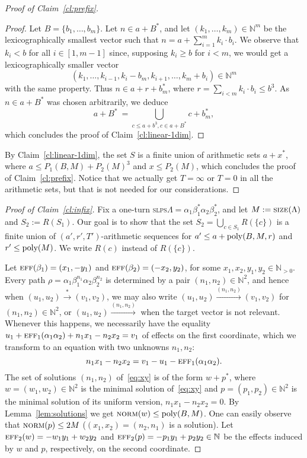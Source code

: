 \documentclass[a4paper, UKenglish, cleveref, autoref, thm-restate]{lipics-v2021}
\newcommand{\N}{\mathbb{N}}
\newcommand{\set}[1]{\{#1\}}
\newcommand{\trans}[1]{\stackrel{#1}{\longrightarrow}}
\newcommand{\tran}{\trans{*}}
\newcommand{\slps}{\textsc{slps}\xspace}
\newcommand{\norm}{\textsc{norm}}
\newcommand{\size}{\textsc{size}}
\newcommand{\eff}{\textsc{eff}}
\newcommand{\poly}{\textup{poly}}
\newcommand{\setfromto}[2]{[#1, #2]}
\newcommand{\setto}[1]{\setfromto 1 {#1}}
\newcommand{\Npos}{\N_{>0}}
\begin{document}
\begin{appendixproof}
\begin{proof}[Proof of Claim~\ref{cl:prefix}]
\begin{proof}
Let $B = \set{b_1, \ldots, b_m}$.
Let $n \in a + B^*$, and let $(k_1, \ldots, k_m) \in \N^m$ be the lexicographically smallest vector such that
$n = a + \sum_{i=1}^m k_i \cdot b_i$.
We observe that $k_i < b$ for all $i\in\setto {m-1}$ since,
supposing $k_i \geq b$ for
$i < m$, we would get a lexicographically smaller  vector
\[
(k_1, \ldots, k_{i-1}, k_i - b_m, k_{i+1}, \ldots, k_m+ b_i) \in \N^m
\]
with the same property. 
Thus $n \in a + r + b_m^*$,
where $r = \sum_{i<m} k_i \cdot b_i \leq b^3$. 
As $n\in a+ B^*$ was chosen arbitrarily, we deduce
\[
a+B^* \ = \bigcup_{c \leq a+b^3, c \in a+B^*} c + b_m^*,
\]
which concludes the proof of Claim~\ref{cl:linear-1dim}.
\end{proof}
By Claim~\ref{cl:linear-1dim}, the set $S$ is a finite union of arithmetic sets  $a+x^*$, where 
$a \leq P_1(B,M) + P_2(M)^3$ and $x \leq P_2(M)$,
which concludes the proof of Claim~\ref{cl:prefix}.
Notice that we actually get $T = \infty$ or $T=0$ in all the arithmetic sets, but that is not needed for our considerations.
\end{proof}



\begin{proof}[Proof of Claim~\ref{cl:infix}]
Fix a  one-turn \slps $\Lambda=\alpha_1\beta_1^*\alpha_2\beta_2^*$, and
let $M:=\size(\Lambda)$ and $S_2 := R(S_1)$.
Our goal is to show that the set $S_2 = \bigcup_{c\in S_1} R(\{c\})$
is a finite union
of $(a', r', T')$-arithmetic sequences for $a' \leq a + \poly(B, M, r)$ and $r' \leq \poly(M)$.
We write $R(c)$ instead of $R(\{c\})$.

Let $\eff(\beta_1) = (x_1, -y_1)$ and $\eff(\beta_2) = (-x_2, y_2)$, for some $x_1, x_2, y_1, y_2 \in \Npos$.
Every path $\rho = \alpha_1\beta_1^{n_1}\alpha_2\beta_2^{n_2}$ is determined by 
a pair $(n_1,n_2) \in \N^2$,
and hence when $(u_1, u_2) \tran (v_1, v_2)$, we may also write $(u_1, u_2) \trans {(n_1,n_2)} (v_1, v_2)$
for $(n_1, n_2)\in\N^2$, or 
$(u_1, u_2) \trans {(n_1,n_2)}$ when the target vector is not relevant.
Whenever this happens, we necessarily have the equality
$
u_1 + \eff_1(\alpha_1 \alpha_2) + n_1 x_1 - n_2 x_2 = v_1
$
of effects on the first coordinate,
which we transform to an equation with two unknowns $n_1,  n_2$:
\begin{equation}\label{eq:xy}
n_1 x_1 - n_2 x_2 = v_1 - u_1 - \eff_1(\alpha_1 \alpha_2).
\end{equation}
The set of solutions $(n_1, n_2)$ of~\eqref{eq:xy} is of the form $w+p^*$, 
where $w = (w_1, w_2) \in \N^2$ is the minimal solution of~\eqref{eq:xy}
and $p = (p_1, p_2) \in \N^2$ is the minimal solution of its uniform version, $n_1 x_1 - n_2 x_2 = 0$.
By Lemma~\ref{lem:solutions} we get $\norm(w) \leq \poly(B, M)$. One can easily observe that $\norm(p) \leq 2M$
($(x_1, x_2) = (n_2, n_1)$ is a solution).
Let $\eff_2(w) = -w_1 y_1 + w_2 y_2$ and $\eff_2(p) = -p_1 y_1 + p_2 y_2\in \N$ be 
the effects induced by $w$ and $p$, respectively, on the second coordinate.


\end{proof}
\end{appendixproof}
\end{document}

